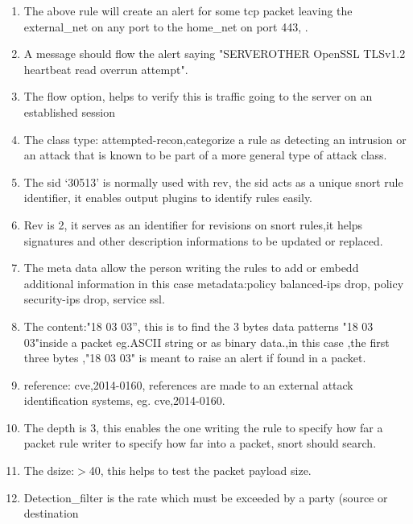 \documentclass{article} %
\begin{document}
\begin{enumerate}
\item  The above rule will create an alert for some tcp packet leaving the external\_net on any port to the home\_net on port 443, .

\item  A message should flow the alert saying "SERVEROTHER OpenSSL TLSv1.2 heartbeat read overrun attempt".

\item  The flow option, helps to verify this is traffic going to the server on an established session

\item  The class type: attempted-recon,categorize a rule as detecting an intrusion or an attack that is known to be part of a more general type of attack class.

\item  The sid `30513' is normally used with rev, the sid acts as a unique snort rule identifier, it enables output plugins to identify rules easily.

\item  Rev is 2, it serves as an identifier for revisions on snort rules,it helps signatures and other description informations to be updated or replaced.

\item  The meta data allow the person writing the rules to add or embedd additional information in this case metadata:policy balanced-ips drop, policy security-ips drop, service ssl.

\item  The content:"{\textbar}18 03 03{\textbar}'', this is to find the 3 bytes data patterns "{\textbar}18 03 03{\textbar}"inside a packet eg.ASCII string or as binary data.,in this case ,the first three bytes ,"{\textbar}18 03 03{\textbar}" is meant to raise an alert if found in a packet.

\item  reference: cve,2014-0160, references are made to an external attack identification systems, eg. cve,2014-0160.

\item  The depth is 3, this enables the one writing the rule to specify how far a packet rule writer to specify how far into a packet, snort should search.

\item  The dsize:$>$40, this helps to test the packet payload size.

\item  Detection\_filter is the rate which must be exceeded by a party (source or destination
\end{enumerate}
\end{document}
